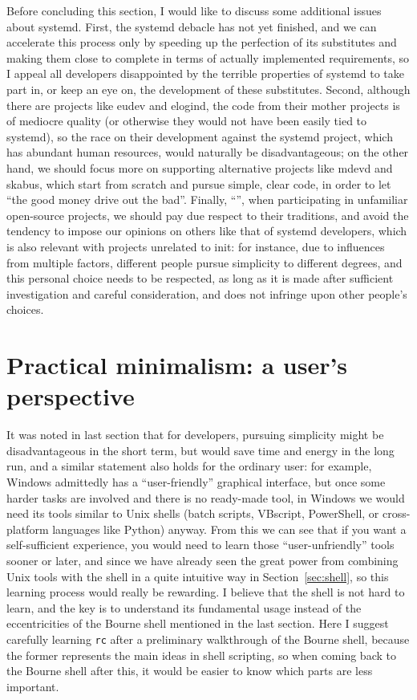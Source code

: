 Before concluding this section, I would like to discuss some additional issues
about systemd.  First, the systemd debacle has not yet finished, and we can
accelerate this process only by speeding up the perfection of its substitutes
and making them close to complete in terms of actually implemented requirements,
so I appeal all developers disappointed by the terrible properties of systemd
to take part in, or keep an eye on, the development of these substitutes.
Second, although there are projects like eudev and elogind, the code from their
mother projects is of mediocre quality (or otherwise they would not have been
easily tied to systemd), so the race on their development against the systemd
project, which has abundant human resources, would naturally be disadvantageous;
on the other hand, we should focus more on supporting alternative projects
like mdevd and skabus, which start from scratch and pursue simple, clear code,
in order to let ``the good money drive out the bad''.  Finally, ``'', when participating in unfamiliar
open-source projects, we should pay due respect to their traditions, and avoid
the tendency to impose our opinions on others like that of systemd developers,
which is also relevant with projects unrelated to init: for instance, due to
influences from multiple factors, different people pursue simplicity to
different degrees, and this personal choice needs to be respected,
as long as it is made after sufficient investigation and careful
consideration, and does not infringe upon other people's choices.

\section{Practical minimalism: a user's perspective}\label{sec:user}

It was noted in last section that for developers, pursuing simplicity might be
disadvantageous in the short term, but would save time and energy in the long
run, and a similar statement also holds for the ordinary user: for example,
Windows admittedly has a ``user-friendly'' graphical interface, but once some
harder tasks are involved and there is no ready-made tool, in Windows we would
need its tools similar to Unix shells (batch scripts, VBscript, PowerShell,
or cross-platform languages like Python) anyway.  From this we can see that
if you want a self-sufficient experience, you would need to learn those
``user-unfriendly'' tools sooner or later, and since we have already seen the
great power from combining Unix tools with the shell in a quite intuitive way
in Section~\ref{sec:shell}, so this learning process would really be rewarding.
I believe that the shell is not hard to learn, and the key is to understand
its fundamental usage instead of the eccentricities of the Bourne shell
mentioned in the last section.  Here I suggest carefully learning \verb|rc|%
 after a preliminary walkthrough of the Bourne shell,
because the former represents the main ideas in shell scripting,
so when coming back to the Bourne shell after this, it would
be easier to know which parts are less important.

